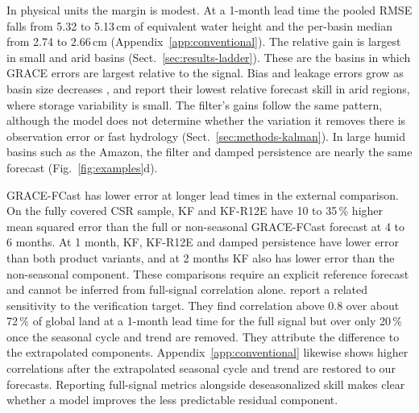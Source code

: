 \documentclass[hess, manuscript]{copernicus}
\begin{document}
In physical units the margin is modest. At a 1-month lead time the pooled
RMSE falls from
5.32 to 5.13\,cm of equivalent water height and the per-basin median from
2.74 to 2.66\,cm (Appendix~\ref{app:conventional}). The relative gain
is largest in small and arid basins (Sect.~\ref{sec:results-ladder}).
These are the basins in which GRACE errors are largest relative to the
signal. Bias and leakage errors grow as basin size decreases
\citep{longuevergne2010smallbasins, vishwakarma2018resolution}, and
\citet{li2026fcast} report their lowest relative forecast skill in arid
regions, where storage variability is small. The filter's gains follow
the same pattern, although the model does not determine whether the
variation it removes there is observation error or fast hydrology
(Sect.~\ref{sec:methods-kalman}). In large humid basins such as the
Amazon, the filter and damped persistence are nearly the same forecast
(Fig.~\ref{fig:examples}d).

GRACE-FCast has lower error at longer lead times in the external
comparison. On the fully covered CSR sample, KF and KF-R12E have
10 to 35\,\% higher mean squared error than the full or non-seasonal
GRACE-FCast forecast at 4 to 6 months. At 1 month, KF, KF-R12E and damped
persistence have lower error than both product variants, and at 2 months
KF also has lower error than the non-seasonal component. These comparisons require
an explicit reference forecast and cannot be inferred from full-signal
correlation alone. \citet{li2026fcast} report a related sensitivity to
the verification target. They find
correlation above 0.8 over about 72\,\% of global land at a 1-month lead
time for the full signal but over only 20\,\% once the seasonal cycle and
trend are removed. They attribute the difference to the extrapolated
components.
Appendix~\ref{app:conventional} likewise shows higher correlations after
the extrapolated seasonal cycle and trend are restored to our forecasts.
Reporting full-signal metrics alongside deseasonalized skill makes clear
whether a model improves the less predictable residual component.
\end{document}
